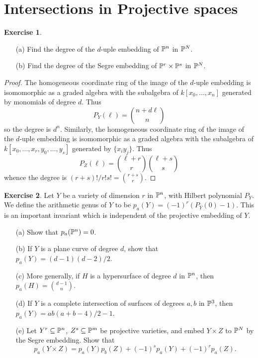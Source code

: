 \documentclass[11pt]{book}
\theoremstyle{definition}
\newtheorem{exercise}{Exercise}[section]
\begin{document}
\section{Intersections in Projective spaces}
\begin{exercise}
\mbox{}
\begin{itemize}
\item[(a)] Find the degree of the $d$-uple embedding of $\P^n$ in $\P^N$.
\item[(b)] Find the degree of the Segre embedding of $\P^r\times\P^s$ in $\P^N$.
\end{itemize}
\end{exercise}
\begin{proof}
The homogeneous coordinate ring of the image of the $d$-uple embedding is isomomorphic as a graded algebra with the subalgebra of $k[x_0,\dots,x_n]$ generated by monomials of degree $d$. Thus
\[P_Y(\ell)=\binom{n+d\ell}{n}\]
so the degree is $d^n$. Similarly, the homogeneous coordinate ring of the image of the $d$-uple embedding is isomomorphic as a graded algebra with the subalgebra of $k[x_0,\dots,x_r,y_0,\dots,y_s]$ generated by $\{x_iy_j\}$. Thus
\[P_Z(\ell)=\binom{\ell+r}{r}\binom{\ell+s}{s}\]
whence the degree is $(r+s)!/r!s!=\binom{r+s}{r}$.
\end{proof}
\begin{exercise}
Let $Y$ be a variety of dimension $r$ in $\P^n$, with Hilbert polynomial $P_Y$. We define the arithmetic genus of $Y$ to be $p_a(Y)=(-1)^r(P_Y(0)-1)$. This is an important invariant which is independent of the projective embedding of $Y$.
\begin{itemize}
\item[(a)] Show that $p_a(\P^n)=0$. 
\item[(b)] If $Y$ is a plane curve of degree $d$, show that $p_a(Y)=(d-1)(d-2)/2$.
\item[(c)] More generally, if $H$ is a hypersurface of degree $d$ in $\P^n$, then $p_a(H)=\binom{d-1}{n}$.
\item[(d)] If $Y$ is a complete intersection of surfaces of degrees $a,b$ in $\P^3$, then $p_a(Y)=ab(a+b-4)/2-1$.
\item[(e)] Let $Y^r\sub\P^n$, $Z^s\sub\P^m$ be projective varieties, and embed $Y\times Z$ to $\P^N$ by the Segre embedding. Show that
\[p_a(Y\times Z)=p_a(Y)p_b(Z)+(-1)^sp_a(Y)+(-1)^rp_a(Z).\] 
\end{itemize}
\end{exercise}
\end{document}
